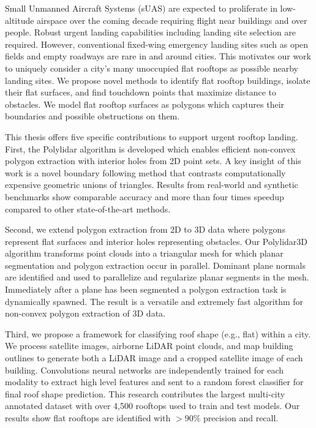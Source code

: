 Small Unmanned Aircraft Systems (sUAS) are expected to proliferate in low-altitude airspace over the coming decade requiring flight near buildings and over people.
Robust urgent landing capabilities including landing site selection are required.
However, conventional fixed-wing emergency landing sites such as open fields and empty roadways are rare in and around cities. This motivates our work to uniquely consider a city's many unoccupied flat rooftops as possible nearby landing sites. We propose novel methods to identify flat rooftop buildings, isolate their flat surfaces, and find touchdown points that maximize distance to obstacles. We model flat rooftop surfaces as polygons which captures their boundaries and possible obstructions on them.

This thesis offers five specific contributions to support urgent rooftop landing. First, the Polylidar algorithm is developed which enables efficient non-convex polygon extraction with interior holes from 2D point sets.  A key insight of this work is a novel boundary following method that contrasts computationally expensive geometric unions of triangles. Results from real-world and synthetic benchmarks show comparable accuracy and more than four times speedup compared to other state-of-the-art methods. 

Second, we extend polygon extraction from 2D to 3D data where polygons represent flat surfaces and interior holes representing obstacles. Our Polylidar3D algorithm transforms point clouds into a triangular mesh for which planar segmentation and polygon extraction occur in parallel. Dominant plane normals are identified and used to parallelize and regularize planar segments in the mesh. Immediately after a plane has been segmented a polygon extraction task is dynamically spawned. The result is a versatile and extremely fast algorithm for non-convex polygon extraction of 3D data.

Third, we propose a framework for classifying roof shape (e.g., flat) within a city. We process satellite images, airborne LiDAR point clouds, and map building outlines to generate both a LiDAR image and a cropped satellite image of each building. Convolutions neural networks are independently trained for each modality to extract high level features and sent to a random forest classifier for final roof shape prediction. This research contributes the largest multi-city annotated dataset with over 4,500 rooftops used to train and test models. Our results show flat rooftops are identified with $> 90\%$ precision and recall. 


